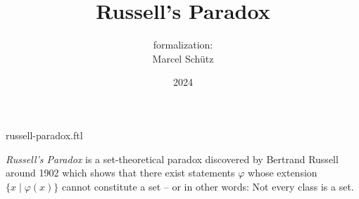 \documentclass{article}
\title{Russell's Paradox}
\author{\Naproche formalization:\\[0.5em]Marcel Schütz}
\date{2024}
\begin{document}
\begin{smodule}{russell-paradox.ftl}
  \maketitle
  \hidetlsnumbers


  \noindent \emph{Russell's Paradox} is a set-theoretical paradox discovered by
  Bertrand Russell around 1902 \cite[chapter XV]{Frege1980} which shows that 
  there exist statements $\varphi$ whose extension
  $\{x\mid\varphi(x)\}$ cannot constitute a set -- or in other words:
  Not every class is a set.


  \printbibliography
\end{smodule}
\end{document}

